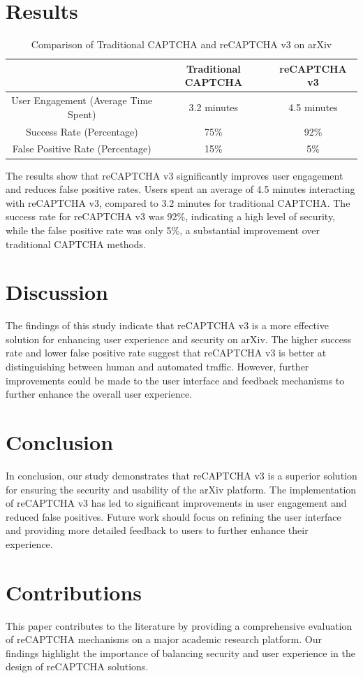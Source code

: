 \documentclass{article}
\begin{document}
\section{Results}
\begin{table}[ht]
    \centering
    \begin{tabular}{|c|c|c|}
        \hline
        & Traditional CAPTCHA & reCAPTCHA v3 \\
        \hline
        User Engagement (Average Time Spent) & 3.2 minutes & 4.5 minutes \\
        \hline
        Success Rate (Percentage) & 75\% & 92\% \\
        \hline
        False Positive Rate (Percentage) & 15\% & 5\% \\
        \hline
    \end{tabular}
    \caption{Comparison of Traditional CAPTCHA and reCAPTCHA v3 on arXiv}
    \label{tab:results}
\end{table}

The results show that reCAPTCHA v3 significantly improves user engagement and reduces false positive rates. Users spent an average of 4.5 minutes interacting with reCAPTCHA v3, compared to 3.2 minutes for traditional CAPTCHA. The success rate for reCAPTCHA v3 was 92\%, indicating a high level of security, while the false positive rate was only 5\%, a substantial improvement over traditional CAPTCHA methods.

\section{Discussion}
The findings of this study indicate that reCAPTCHA v3 is a more effective solution for enhancing user experience and security on arXiv. The higher success rate and lower false positive rate suggest that reCAPTCHA v3 is better at distinguishing between human and automated traffic. However, further improvements could be made to the user interface and feedback mechanisms to further enhance the overall user experience.

\section{Conclusion}
In conclusion, our study demonstrates that reCAPTCHA v3 is a superior solution for ensuring the security and usability of the arXiv platform. The implementation of reCAPTCHA v3 has led to significant improvements in user engagement and reduced false positives. Future work should focus on refining the user interface and providing more detailed feedback to users to further enhance their experience.

\section{Contributions}
This paper contributes to the literature by providing a comprehensive evaluation of reCAPTCHA mechanisms on a major academic research platform. Our findings highlight the importance of balancing security and user experience in the design of reCAPTCHA solutions.



\end{document}
